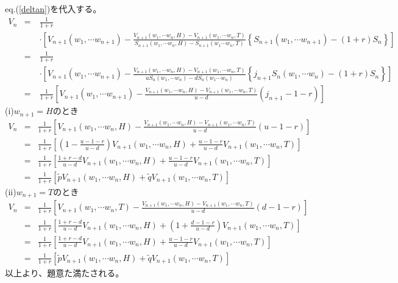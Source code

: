 \documentclass[10pt]{article}
\theoremstyle{plain}
\begin{document}
eq.(\ref{deltan})を代入する。
\begin{eqnarray}
V_{n} &=& \frac{1}{1+r}\\
&\quad&\cdot\left[V_{n+1}(w_1,\cdots w_{n+1})- \frac{V_{n+1}(w_1,\cdots w_n,H)-V_{n+1}(w_1,\cdots w_n,T)}{S_{n+1}(w_1,\cdots w_n,H)- S_{n+1}(w_1\cdots w_n,T)}\left\{S_{n+1}(w_1,\cdots w_{n+1})-(1+r)S_n\right\}\right]\\
&=& \frac{1}{1+r}\\
&\quad&\cdot\left[V_{n+1}(w_1,\cdots w_{n+1})- \frac{V_{n+1}(w_1,\cdots w_n,H)-V_{n+1}(w_1,\cdots w_n,T)}{uS_{n}(w_1,\cdots w_n)- dS_{n}(w_1\cdots w_n)}\left\{j_{n+1}S_{n}(w_1,\cdots w_{n})-(1+r)S_n\right\}\right]\\
&=& \frac{1}{1+r}\left[V_{n+1}(w_1,\cdots w_{n+1})- \frac{V_{n+1}(w_1,\cdots w_n,H)-V_{n+1}(w_1,\cdots w_n,T)}{u- d}\left(j_{n+1}-1-r\right)\right]
\end{eqnarray}
(i)$w_{n+1}=H$のとき
\begin{eqnarray}
V_{n}
&=& \frac{1}{1+r}\left[V_{n+1}(w_1,\cdots w_n,H)- \frac{V_{n+1}(w_1,\cdots w_n,H)-V_{n+1}(w_1,\cdots w_n,T)}{u- d}\left(u-1-r\right)\right]\\
&=& \frac{1}{1+r}\left[\left(1-\frac{u-1-r}{u-d}\right)V_{n+1}(w_1,\cdots w_n,H) + \frac{u-1-r}{u-d}V_{n+1}(w_1,\cdots w_n,T)\right]\\
&=& \frac{1}{1+r}\left[\frac{1+r-d}{u-d}V_{n+1}(w_1,\cdots w_n,H) + \frac{u-1-r}{u-d}V_{n+1}(w_1,\cdots w_n,T)\right]\\
&=& \frac{1}{1+r}\left[\tilde{p}V_{n+1}(w_1,\cdots w_n,H) + \tilde{q}V_{n+1}(w_1,\cdots w_n,T)\right]
\end{eqnarray}
(ii)$w_{n+1}=T$のとき
\begin{eqnarray}
V_{n}
&=& \frac{1}{1+r}\left[V_{n+1}(w_1,\cdots w_n,T)- \frac{V_{n+1}(w_1,\cdots w_n,H)-V_{n+1}(w_1,\cdots w_n,T)}{u- d}\left(d-1-r\right)\right]\\
&=& \frac{1}{1+r}\left[\frac{1+r-d}{u-d}V_{n+1}(w_1,\cdots w_n,H) + \left(1+\frac{d-1-r}{u-d}\right)V_{n+1}(w_1,\cdots w_n,T)\right]\\
&=& \frac{1}{1+r}\left[\frac{1+r-d}{u-d}V_{n+1}(w_1,\cdots w_n,H) + \frac{u-1-r}{u-d}V_{n+1}(w_1,\cdots w_n,T)\right]\\
&=& \frac{1}{1+r}\left[\tilde{p}V_{n+1}(w_1,\cdots w_n,H) + \tilde{q}V_{n+1}(w_1,\cdots w_n,T)\right]
\end{eqnarray}
以上より、題意た満たされる。
\hrulefill \hspace{5cm}
\end{document}
